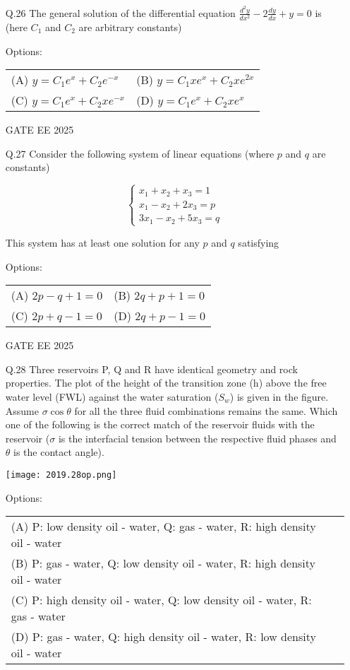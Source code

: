 \documentclass[journal]{IEEEtran}
\begin{document}
\begin{enumerate}[resume*=q]
\item[Q.26] The general solution of the differential equation $\frac{d^2 y}{dx^2} - 2 \frac{dy}{dx} + y = 0$ is (here $C_1$ and $C_2$ are arbitrary constants)

Options:
\begin{tabular}{ll}
(A) $y = C_1 e^x + C_2 e^{-x}$ & (B) $y = C_1 xe^x + C_2 xe^{2x}$ \\
(C) $y = C_1 e^x + C_2 xe^{-x}$ & (D) $y = C_1 e^x + C_2 xe^x$
\end{tabular}

GATE EE 2025
 \vspace{0.5cm} 
\item[Q.27] Consider the following system of linear equations (where $p$ and $q$ are constants)

\[
\begin{cases}
x_1 + x_2 + x_3 = 1 \\
x_1 - x_2 + 2x_3 = p \\
3x_1 - x_2 + 5x_3 = q
\end{cases}
\]

This system has at least one solution for any $p$ and $q$ satisfying

Options:
\begin{tabular}{ll}
(A) $2p - q + 1 = 0$ & (B) $2q + p + 1 = 0$ \\
(C) $2p + q - 1 = 0$ & (D) $2q + p - 1 = 0$
\end{tabular}

GATE EE 2025
 \vspace{0.5cm} 
\item[Q.28] Three reservoirs P, Q and R have identical geometry and rock properties. The plot of the height of the transition zone (h) above the free water level (FWL) against the water saturation ($S_w$) is given in the figure. Assume $\sigma \cos \theta$ for all the three fluid combinations remains the same. Which one of the following is the correct match of the reservoir fluids with the reservoir ($\sigma$ is the interfacial tension between the respective fluid phases and $\theta$ is the contact angle).

\begin{center}
\texttt{[image: 2019.28op.png]}
\end{center}

Options:
\begin{tabular}{ll}
(A) P: low density oil - water, Q: gas - water, R: high density oil - water \\
(B) P: gas - water, Q: low density oil - water, R: high density oil - water \\
(C) P: high density oil - water, Q: low density oil - water, R: gas - water \\
(D) P: gas - water, Q: high density oil - water, R: low density oil - water
\end{tabular}


\end{enumerate}
\end{document}
